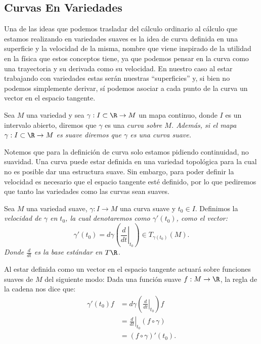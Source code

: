 \subsection{Curvas En Variedades}\label{Subsección: Curvas En Variedades}
Una de las ideas que podemos trasladar del cálculo ordinario al cálculo que estamos realizando en variedades suaves es la idea de curva definida en una superficie y la velocidad de la misma, nombre que viene inspirado de la utilidad en la física que estos conceptos tiene, ya que podemos pensar en la curva como una trayectoria y su derivada como su velocidad.
En nuestro caso al estar trabajando con variedades estas serán nuestras \enquote{superficies} y, si bien no podemos simplemente derivar, sí podemos asociar a cada punto de la curva un vector en el espacio tangente.

\begin{definition}
  \label{Definición: Curva en Variedades}
	Sea $M$ una variedad y sea $\gamma: I \subset \R \to M$ un mapa continuo, donde $I$ es un intervalo abierto, diremos que $\gamma$ es una \it{curva sobre $M$}. Además, si el mapa $\gamma: I \subset \R \to M$ es suave diremos que $\gamma$ es una curva suave.
\end{definition}

Notemos que para la definición de curva solo estamos pidiendo continuidad, no suavidad. Una curva puede estar definida en una variedad topológica para la cual no es posible dar una estructura suave. Sin embargo, para poder definir la velocidad es necesario que el espacio tangente esté definido, por lo que pediremos que tanto las variedades como las curvas sean suaves.

\begin{definition}
	Sea $M$ una variedad suave, $\gamma: I \to M$ una curva suave y $t_0 \in I$. Definimos la \it{velocidad de $\gamma$ en $t_0$}, la cual denotaremos como $\gamma'(t_0)$, como el vector:
	\[
		\gamma'(t_0)
		=
		d\gamma\left( \left.  \frac{d}{dt}\right|_{t_0} \right)
		\in
		T_{\gamma(t_0)}(M).
	\]
	Donde $\frac{d}{dt}$ es la base estándar en $T\R$.
\end{definition}

Al estar definida como un vector en el espacio tangente actuará sobre funciones suaves de $M$ del siguiente modo: Dada una función suave $f: M \to \R$, la regla de la cadena nos dice que:
\begin{align*}
	\gamma'(t_0) f & =d\gamma\left(\left.\frac{d}{dt}\right|_{t_0} \right)f \\
	               & = \left. \frac{d}{dt} \right|_{t_0} (f \circ \gamma)   \\
	               & = (f \circ \gamma)' (t_0).
\end{align*}

